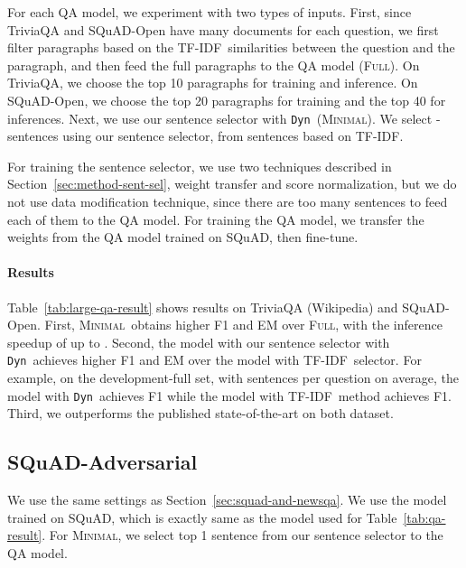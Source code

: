 \documentclass[11pt,a4paper]{article}
\newcommand{\dyn}{{\tt Dyn}}
\newcommand{\full}{\textsc{Full}}
\newcommand{\ours}{\textsc{Minimal}}
\newcommand{\fullshort}{(\textsc{Full})}
\newcommand{\oursshort}{(\textsc{Minimal})}
\newcommand{\tfidf}{TF-IDF}
\begin{document}
 
For each QA model, we experiment with two types of inputs.
First, since TriviaQA and SQuAD-Open have many documents for each question, we first filter paragraphs based on the \tfidf~similarities between the question and the paragraph, and then feed the full paragraphs to the QA model \fullshort.
On TriviaQA, we choose the top 10 paragraphs for training and inference.
On SQuAD-Open, we choose the top 20 paragraphs for training and the top 40 for inferences.
Next, we use our sentence selector with \dyn~\oursshort.
We select - sentences using our sentence selector, from  sentences based on \tfidf.


For training the sentence selector, we use two techniques described in Section~\ref{sec:method-sent-sel}, weight transfer and score normalization, but we do not use data modification technique, since there are too many sentences to feed each of them to the QA model.
For training the QA model, we transfer the weights from the QA model trained on SQuAD, then fine-tune.


\paragraph{Results}
Table~\ref{tab:large-qa-result} shows results on TriviaQA (Wikipedia) and SQuAD-Open.
First, \ours~obtains higher F1 and EM over \full, with the inference speedup of up to .
Second, the model with our sentence selector with \dyn~achieves higher F1 and EM over the model with \tfidf~selector.
For example, on the development-full set, with  sentences per question on average, the model with \dyn~achieves  F1 while the model with \tfidf~method achieves  F1.
Third, we outperforms the published state-of-the-art on both dataset.

\subsection{SQuAD-Adversarial}\label{sec:squad-adv}
We use the same settings as Section~\ref{sec:squad-and-newsqa}.
We use the model trained on SQuAD, which is exactly same as the model used for Table~\ref{tab:qa-result}. For \ours, we select top 1 sentence from our sentence selector to the QA model.
\end{document}
